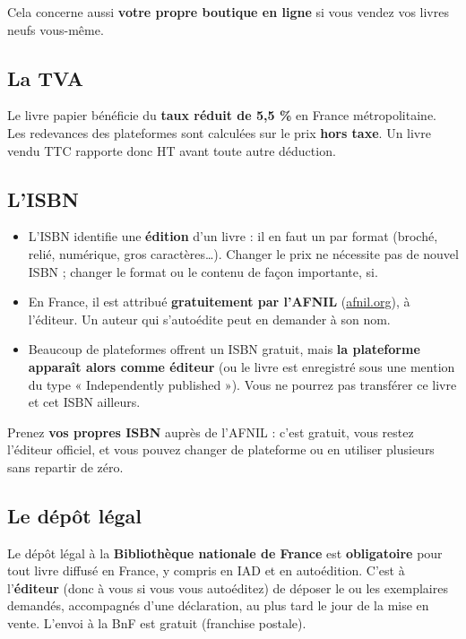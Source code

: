 Cela concerne aussi \textbf{votre propre boutique en ligne} si vous
vendez vos livres neufs vous-même.

\subsection{La TVA}

Le livre papier bénéficie du \textbf{taux réduit de 5,5 \%} en France
métropolitaine. Les redevances des plateformes sont calculées sur le
prix \textbf{hors taxe}. Un livre vendu \eur{\exPrixTTC} TTC rapporte donc
\eur{\exPrixHT} HT avant toute autre déduction.

\subsection{L’ISBN}

\begin{itemize}
  \item L’ISBN identifie une \textbf{édition} d’un livre :
        il en faut un par format (broché, relié, numérique, gros
        caractères…). Changer le prix ne nécessite pas de nouvel ISBN ;
        changer le format ou le contenu de façon importante, si.
  \item En France, il est attribué \textbf{gratuitement par l’AFNIL}
        (\href{https://www.afnil.org}{afnil.org}), à l’éditeur.
        Un auteur qui s’autoédite peut en demander à son nom.
  \item Beaucoup de plateformes offrent un ISBN gratuit, mais
        \textbf{la plateforme apparaît alors comme éditeur} (ou le livre
        est enregistré sous une mention du type « Independently
        published »). Vous ne pourrez pas transférer ce livre et cet
        ISBN ailleurs.
\end{itemize}

\begin{astuce}
Prenez \textbf{vos propres ISBN} auprès de l’AFNIL : c’est gratuit,
vous restez l’éditeur officiel, et vous pouvez changer de plateforme ou
en utiliser plusieurs sans repartir de zéro.
\end{astuce}

\subsection{Le dépôt légal}

Le dépôt légal à la \textbf{Bibliothèque nationale de France} est
\textbf{obligatoire} pour tout livre diffusé en France, y compris en IAD
et en autoédition. C’est à l’\textbf{éditeur} (donc à vous si vous vous
autoéditez) de déposer le ou les exemplaires demandés, accompagnés d’une
déclaration, au plus tard le jour de la mise en vente. L’envoi à la BnF
est gratuit (franchise postale).

